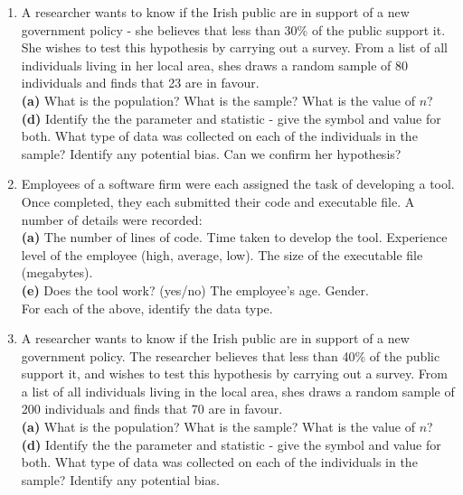 \documentclass[]{report}
\begin{document}
\begin{enumerate}
\item 
A researcher wants to know if the Irish public are in support of a new government policy - she believes that less than 30\% of the public support it. She wishes to test this hypothesis by carrying out a survey. From a list of all individuals living in her local area, shes draws a random sample of 80 individuals and finds that 23 are in favour.\\[-0.2cm]

{\bf(a)} What is the population? What is the sample? What is the value of $n$?\quad \\{\bf(d)} Identify the the parameter and statistic - give the symbol and value for both. What type of data was collected on each of the individuals in the sample?   Identify any potential bias. Can we confirm her hypothesis?

\item 
Employees of a software firm were each assigned the task of developing a tool. Once completed, they each submitted their code and executable file. A number of details were recorded:\\[-0.2cm]

{\bf(a)} The number of lines of code. Time taken to develop the tool.  Experience level of the employee (high, average, low).  The size of the executable file (megabytes).\quad \\ {\bf(e)} Does the tool work? (yes/no)   The employee's age. Gender.\\[-0.2cm]

For each of the above, identify the data type.

\item A researcher wants to know if the Irish public are in support of a new government policy. The researcher believes that less than 40\% of the public support it, and wishes to test this hypothesis by carrying out a survey. From a list of all individuals living in the local area, shes draws a random sample of 200 individuals and finds that 70 are in favour.\\[-0.2cm]

{\bf(a)} What is the population? What is the sample? What is the value of $n$?\quad \\{\bf(d)} Identify the the parameter and statistic - give the symbol and value for both. What type of data was collected on each of the individuals in the sample?   Identify any potential bias.




\end{enumerate}
\end{document}
